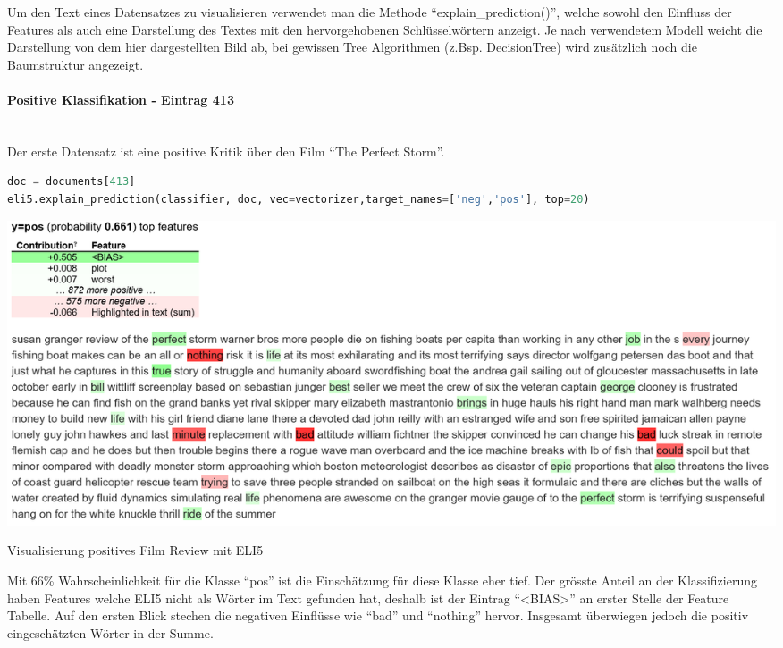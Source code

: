 \documentclass[
  12pt, %
  a4paper, %
  oneside, %
  openany, 
  numbers=noenddot, %
  BCOR=5mm, %
  parskip=half*, %
  thesis, %
]{bfhbook}
\newcommand{\parag}[1]{\paragraph*{#1}\mbox{}\\}
\begin{document}
Um den Text eines Datensatzes zu visualisieren verwendet man die Methode ``explain\_prediction()'', welche sowohl den Einfluss der Features als auch eine Darstellung des Textes mit den hervorgehobenen Schlüsselwörtern anzeigt. Je nach verwendetem Modell weicht die Darstellung von dem hier dargestellten Bild ab, bei gewissen Tree Algorithmen (z.Bsp. DecisionTree) wird zusätzlich noch die Baumstruktur angezeigt.

\parag{Positive Klassifikation - Eintrag 413}
Der erste Datensatz ist eine positive Kritik über den Film ``The Perfect Storm''.
\begin{lstlisting}[language=Python]
doc = documents[413]
eli5.explain_prediction(classifier, doc, vec=vectorizer,target_names=['neg','pos'], top=20)
\end{lstlisting}
\label{eli5413}

\begin{center}
\begin{minipage}[t]{\linewidth}
\includegraphics[width=\textwidth]{Bilder/MovieReviews-SentimentClassification_ELI5-413.PNG}
\caption{Visualisierung positives Film Review mit ELI5}
\end{minipage}
\end{center}

Mit 66\% Wahrscheinlichkeit für die Klasse ``pos'' ist die Einschätzung für diese Klasse eher tief. Der grösste Anteil an der Klassifizierung haben Features welche ELI5 nicht als Wörter im Text gefunden hat, deshalb ist der Eintrag ``<BIAS>'' an erster Stelle der Feature Tabelle. Auf den ersten Blick stechen die negativen Einflüsse wie ``bad'' und ``nothing'' hervor. Insgesamt überwiegen jedoch die positiv eingeschätzten Wörter in der Summe.
\end{document}
